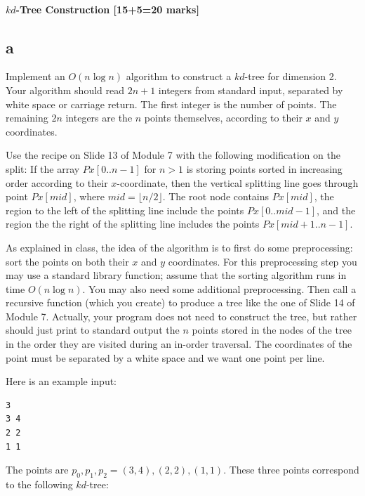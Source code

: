 \documentclass[12pt]{article}
\begin{document}
\subsection{$kd$-Tree Construction [15+5=20 marks]}
\begin{enumerate}
\part{a} Implement an $O(n\log n)$ algorithm to construct a $kd$-tree
for dimension 2.  Your algorithm should read $2n+1$ integers from
standard input, separated by white space or carriage return.  The first integer is the
number of points.  The remaining $2n$ integers are the $n$ points
themselves, according to their $x$ and $y$ coordinates.

Use the recipe on Slide 13 of Module 7 with the following modification on the split:
If the array $Px[0..n-1]$ for $n>1$ is storing points
sorted in increasing order according to their $x$-coordinate, then
the vertical splitting line goes through point $Px[mid]$, where
$mid = \lfloor n/2\rfloor$.  The root node contains $Px[mid]$, the
region to the left of the splitting
line include the points $Px[0..mid-1]$, and the region the the
right of the splitting line includes the points $Px[mid+1..n-1]$.

As explained in class, the idea of the algorithm is to first do some
preprocessing: sort the points on both their $x$ and $y$ coordinates.
For this preprocessing step you may use a standard library function;
assume that the sorting algorithm runs in time $O(n\log n)$. You may
also need some additional preprocessing.  Then call a recursive function
(which you create) to produce a tree like the one of Slide 14 of Module 7.
Actually, your program does not need to construct the tree, but rather
should just print to standard output the $n$ points stored in the nodes
of the tree in the order they are visited during an in-order traversal.
The coordinates of the point must be separated by a white space and we want
one point per line.

Here is an example input:
\begin{verbatim}
3
3 4
2 2
1 1
\end{verbatim}
The points are $p_0,p_1,p_2 = (3,4),(2,2),(1,1)$. These three
points correspond to the following $kd$-tree:

\hfill
{}
\hfill \resizebox{30mm}{!}{}
\hfill \phantom{a}


\end{enumerate}
\end{document}
